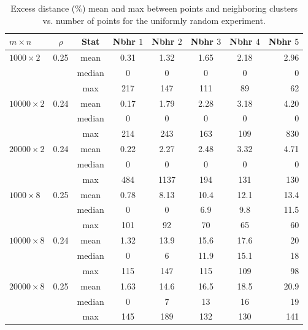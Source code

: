 \documentclass[11pt]{article}
\begin{document}
\begin{table}
\begin{tabular}{l*{6}{c}r}
	$m \times n$ & $\rho$ & Stat & Nbhr $1$ & Nbhr $2$ & Nbhr $3$ & Nbhr $4$ & Nbhr $5$ \\
	\hline
	\hline
	$1000 \times 2$		& 0.25  & mean   & 0.31 & 1.32 &  1.65 & 2.18 & 2.96 \\
	                    &       & median & 0    & 0    &  0    & 0    & 0    \\
       	 		   	  	&       & max    & 217  & 147  &  111  & 89   & 62   \\
	\hline
	$10000 \times 2$	& 0.24  & mean   & 0.17 & 1.79 &  2.28 & 3.18 & 4.20 \\
	                    &       & median & 0    & 0    &  0    & 0    & 0    \\
       	 		   	  	&       & max    & 214  & 243  &  163  & 109  & 830  \\
	\hline
	$20000 \times 2$	& 0.24  & mean   & 0.22 & 2.27 &  2.48 & 3.32 & 4.71 \\
	                    &       & median & 0    & 0    &  0    & 0    & 0    \\
       	 		   	  	&       & max    & 484  & 1137 &  194  & 131  & 130  \\
	\hline
	\hline
	$1000 \times 8$		& 0.25  & mean   & 0.78 & 8.13 &  10.4 & 12.1 & 13.4 \\
	                    &       & median & 0    & 0    &  6.9  & 9.8  & 11.5 \\
       	 		   	  	&       & max    & 101  & 92   &  70   & 65   & 60   \\
	\hline
	$10000 \times 8$	& 0.24  & mean   & 1.32 & 13.9 &  15.6 & 17.6 & 20   \\
	                    &       & median & 0    & 6    &  11.9 & 15.1 & 18   \\
       	 		   	  	&       & max    & 115  & 147  &  115  & 109  & 98   \\
	\hline
	$20000 \times 8$	& 0.25  & mean   & 1.63 & 14.6 &  16.5 & 18.5 & 20.9 \\
	                    &       & median & 0    & 7    &  13   & 16   & 19   \\
       	 		   	  	&       & max    & 145  & 189  &  132  & 130  & 141  \\

	\end{tabular}
	\caption{Excess distance ($\%$) mean and max between points and neighboring clusters vs. number of points for the uniformly random experiment.}
	\label{ed_vs_size}
\end{table}
\end{document}
